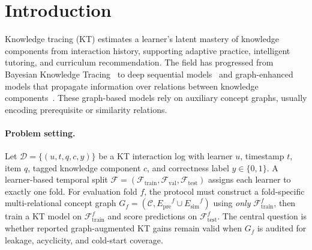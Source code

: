 \documentclass[runningheads]{llncs}
\newcommand{\Epre}{\ensuremath{E_{\text{pre}}}}
\newcommand{\Esim}{\ensuremath{E_{\text{sim}}}}
\newcommand{\KC}{knowledge component}
\newcommand{\KCs}{knowledge components}
\begin{document}
\section{Introduction}
\label{sec:intro}
Knowledge tracing (KT) estimates a learner's latent mastery of
\KCs{} from interaction history, supporting adaptive practice,
intelligent tutoring, and curriculum recommendation. The field has
progressed from Bayesian Knowledge Tracing~\cite{corbett1995bkt} to
deep sequential models~\cite{piech2015dkt,zhang2017dkvmn,ghosh2020akt,
liu2023simplekt,pandey2019rkt,shen2021saint} and graph-enhanced models
that propagate information over relations between
\KCs{}~\cite{nakagawa2019gkt,tong2020skt,yang2021gikt,dygkt2024,
dgekt2024,wang2022grapkt,chen2023hgkt}. These graph-based models rely on
auxiliary concept graphs, usually encoding prerequisite or similarity
relations.

\paragraph{Problem setting.}
Let $\mathcal{D}=\{(u,t,q,c,y)\}$ be a KT interaction log with learner
$u$, timestamp $t$, item $q$, tagged \KC{} $c$, and correctness label
$y\in\{0,1\}$. A learner-based temporal split
$\mathcal{F}=(\mathcal{F}_{\text{train}},\mathcal{F}_{\text{val}},
\mathcal{F}_{\text{test}})$ assigns each learner to exactly one fold.
For evaluation fold $f$, the protocol must construct a fold-specific
multi-relational concept graph
$G_f=(\mathcal{C},\Epre^f\cup\Esim^f)$ using \emph{only}
$\mathcal{F}_{\text{train}}^f$, then train a KT model on
$\mathcal{F}_{\text{train}}^f$ and score predictions on
$\mathcal{F}_{\text{test}}^f$. The central question is whether reported
graph-augmented KT gains remain valid when $G_f$ is audited for
leakage, acyclicity, and cold-start coverage.
\end{document}

